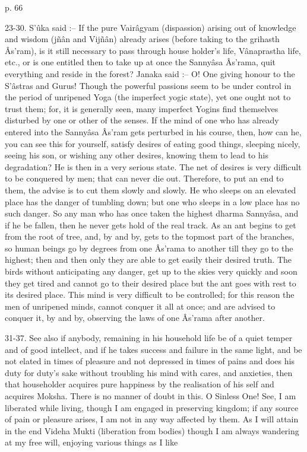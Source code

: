  

p. 66

 

23-30. S’ûka said :-- If the pure Vairâgyam (dispassion) arising out of knowledge and wisdom (jñân and Vijñân) already arises (before taking to the grihasth Âs'ram), is it still necessary to pass through house holder’s life, Vânaprastha life, etc., or is one entitled then to take up at once the Sannyâsa Âs'rama, quit everything and reside in the forest? Janaka said :-- O! One giving honour to the S’âstras and Gurus! Though the powerful passions seem to be under control in the period of unripened Yoga (the imperfect yogic state), yet one ought not to trust them; for, it is generally seen, many imperfect Yogins find themselves disturbed by one or other of the senses. If the mind of one who has already entered into the Sannyâsa Âs’ram gets perturbed in his course, then, how can he, you can see this for yourself, satisfy desires of eating good things, sleeping nicely, seeing his son, or wishing any other desires, knowing them to lead to his degradation? He is then in a very serious state. The net of desires is very difficult to be conquered by men; that can never die out. Therefore, to put an end to them, the advise is to cut them slowly and slowly. He who sleeps on an elevated place has the danger of tumbling down; but one who sleeps in a low place has no such danger. So any man who has once taken the highest dharma Sannyâsa, and if he be fallen, then he never gets hold of the real track. As an ant begins to get from the root of tree, and, by and by, gets to the topmost part of the branches, so human beings go by degrees from one Âs'rama to another till they go to the highest; then and then only they are able to get easily their desired truth. The birds without anticipating any danger, get up to the skies very quickly and soon they get tired and cannot go to their desired place but the ant goes with rest to its desired place. This mind is very difficult to be controlled; for this reason the men of unripened minds, cannot conquer it all at once; and are advised to conquer it, by and by, observing the laws of one Âs’rama after another.

 

31-37. See also if anybody, remaining in his household life be of a quiet temper and of good intellect, and if he takes success and failure in the same light, and be not elated in times of pleasure and not depressed in times of pains and does his duty for duty’s sake without troubling his mind with cares, and anxieties, then that householder acquires pure happiness by the realisation of his self and acquires Moksha. There is no manner of doubt in this. O Sinless One! See, I am liberated while living, though I am engaged in preserving kingdom; if any source of pain or pleasure arises, I am not in any way affected by them. As I will attain in the end Videha Mukti (liberation from bodies) though I am always wandering at my free will, enjoying various things as I like

